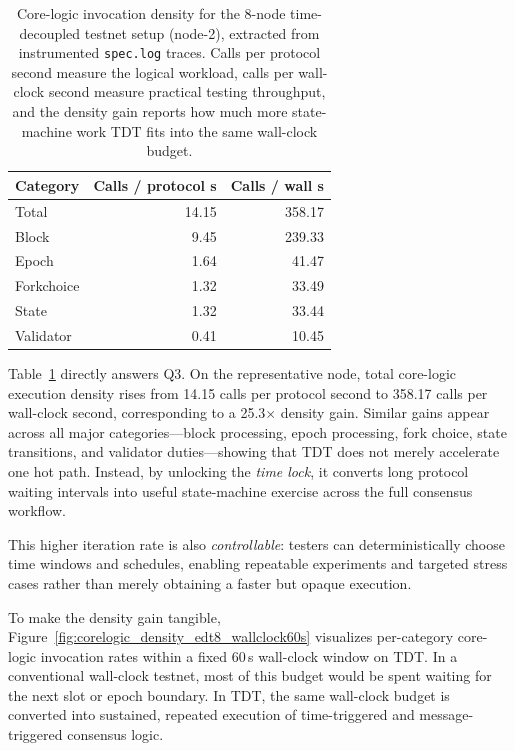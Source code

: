 \begin{table}[t]
\centering
\scriptsize
\setlength{\tabcolsep}{3.5pt}
\caption{Core-logic invocation density for the 8-node time-decoupled testnet setup (node-2), extracted from instrumented \texttt{spec.log} traces. Calls per protocol second measure the logical workload, calls per wall-clock second measure practical testing throughput, and the density gain reports how much more state-machine work TDT fits into the same wall-clock budget.}
\label{tab:effectiveness_corelogic_density_edt8}
\begin{tabular}{lrr}
\toprule
\textbf{Category} & \textbf{Calls / protocol s} & \textbf{Calls / wall s} \\
\midrule
Total      & 14.15 & 358.17 \\
Block      & 9.45  & 239.33 \\
Epoch      & 1.64  & 41.47 \\
Forkchoice & 1.32  & 33.49 \\
State      & 1.32  & 33.44 \\
Validator  & 0.41  & 10.45 \\
\bottomrule
\end{tabular}
\end{table}

Table~\ref{tab:effectiveness_corelogic_density_edt8} directly answers Q3. On the representative node, total core-logic execution density rises from 14.15 calls per protocol second to 358.17 calls per wall-clock second, corresponding to a 25.3$\times$ density gain. Similar gains appear across all major categories---block processing, epoch processing, fork choice, state transitions, and validator duties---showing that TDT does not merely accelerate one hot path. Instead, by unlocking the \emph{time lock}, it converts long protocol waiting intervals into useful state-machine exercise across the full consensus workflow.

This higher iteration rate is also \emph{controllable}: testers can deterministically choose time windows and schedules, enabling repeatable experiments and targeted stress cases rather than merely obtaining a faster but opaque execution.

To make the density gain tangible, Figure~\ref{fig:corelogic_density_edt8_wallclock60s} visualizes per-category core-logic invocation rates within a fixed 60\,s wall-clock window on TDT. In a conventional wall-clock testnet, most of this budget would be spent waiting for the next slot or epoch boundary. In TDT, the same wall-clock budget is converted into sustained, repeated execution of time-triggered and message-triggered consensus logic.

